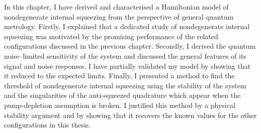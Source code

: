In this chapter, I have derived and characterised a Hamiltonian model of nondegenerate internal squeezing from the perspective of general quantum metrology. Firstly, I explained that a dedicated study of nondegenerate internal squeezing was motivated by the promising performance of the related configurations discussed in the previous chapter. Secondly, I derived the quantum noise--limited sensitivity of the system and discussed the general features of its signal and noise responses. I have partially validated my model by showing that it reduced to the expected limits. Finally, I presented a method to find the threshold of nondegenerate internal squeezing using the stability of the system and the singularities of the anti-squeezed quadrature which appear when the pump-depletion assumption is broken. I justified this method by a physical stability argument and by showing that it recovers the known values for the other configurations in this thesis. 




